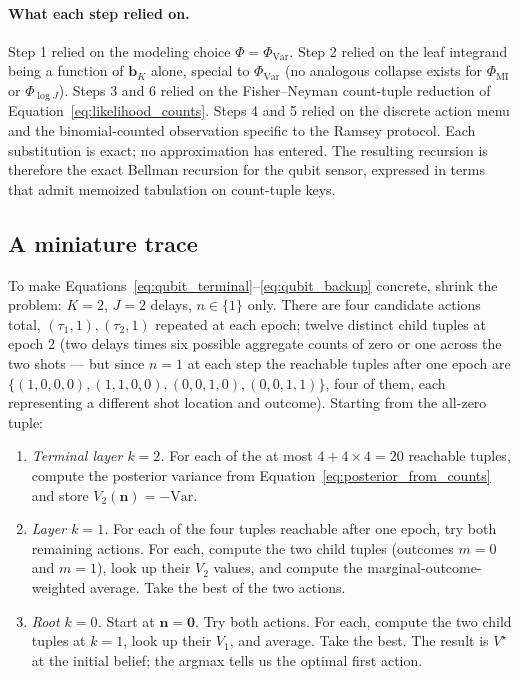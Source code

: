 \documentclass[11pt]{article}
\newcommand{\bb}{\bm{b}}
\begin{document}
\paragraph{What each step relied on.}  Step 1 relied on the modeling choice $\Phi = \Phi_{\text{Var}}$.  Step 2 relied on the leaf integrand being a function of $\bb_K$ alone, special to $\Phi_{\text{Var}}$ (no analogous collapse exists for $\Phi_{\text{MI}}$ or $\Phi_{\log J}$).  Steps 3 and 6 relied on the Fisher--Neyman count-tuple reduction of Equation~\eqref{eq:likelihood_counts}.  Steps 4 and 5 relied on the discrete action menu and the binomial-counted observation specific to the Ramsey protocol.  Each substitution is exact; no approximation has entered.  The resulting recursion is therefore the exact Bellman recursion for the qubit sensor, expressed in terms that admit memoized tabulation on count-tuple keys.

\subsection{A miniature trace}

To make Equations~\eqref{eq:qubit_terminal}--\eqref{eq:qubit_backup} concrete, shrink the problem: $K = 2$, $J = 2$ delays, $n \in \{1\}$ only.  There are four candidate actions total, $(\tau_1, 1), (\tau_2, 1)$ repeated at each epoch; twelve distinct child tuples at epoch $2$ (two delays times six possible aggregate counts of zero or one across the two shots --- but since $n=1$ at each step the reachable tuples after one epoch are $\{(1,0,0,0), (1,1,0,0), (0,0,1,0), (0,0,1,1)\}$, four of them, each representing a different shot location and outcome).  Starting from the all-zero tuple:

\begin{enumerate}[nosep, leftmargin=*]
\item \emph{Terminal layer $k = 2$.}  For each of the at most $4 + 4 \times 4 = 20$ reachable tuples, compute the posterior variance from Equation~\eqref{eq:posterior_from_counts} and store $V_2(\mathbf{n}) = -\mathrm{Var}$.
\item \emph{Layer $k = 1$.}  For each of the four tuples reachable after one epoch, try both remaining actions.  For each, compute the two child tuples (outcomes $m = 0$ and $m = 1$), look up their $V_2$ values, and compute the marginal-outcome-weighted average.  Take the best of the two actions.
\item \emph{Root $k = 0$.}  Start at $\mathbf{n} = \mathbf{0}$.  Try both actions.  For each, compute the two child tuples at $k = 1$, look up their $V_1$, and average.  Take the best.  The result is $V^\star$ at the initial belief; the argmax tells us the optimal first action.
\end{enumerate}
\end{document}
